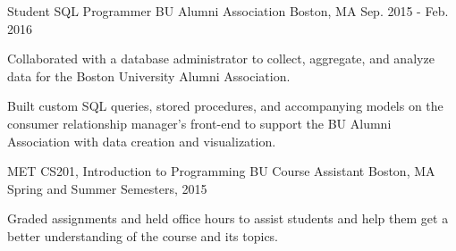 \begin{cventries}

\cventry
{Student SQL Programmer} %
{BU Alumni Association} %
{Boston, MA} %
{Sep. 2015 - Feb. 2016} %
{ %
\begin{cvitems}
\item {Collaborated with a database administrator to collect, aggregate, and analyze
data for the Boston University Alumni Association.}
\item {Built custom SQL queries, stored procedures, and accompanying models on
the consumer relationship manager's front-end to support the BU Alumni
Association with data creation and visualization.}
\end{cvitems}
}


\cventry
{MET CS201, Introduction to Programming} %
{BU Course Assistant} %
{Boston, MA} %
{Spring and Summer Semesters, 2015} %
{ %
\begin{cvitems}
\item {Graded assignments and held office hours to assist students and help them
get a better understanding of the course and its topics.}
\end{cvitems}
}


\end{cventries}

